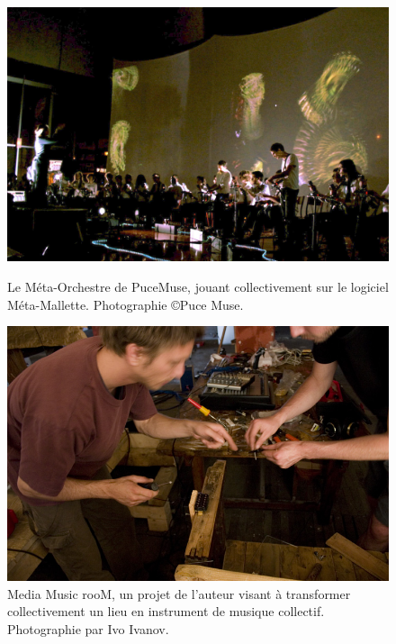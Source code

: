 \begin{figure}[!htbp]
	\captionsetup{format=plain}%
	\centering
	\begin{minipage}[t]{0.48\textwidth}
		\includegraphics[width=\linewidth]{gfx/02_ephemeral/MetaOrchestre.jpg}
		\caption[Méta-Orchestre, jouant collectivement sur le logiciel Méta-Mallette]{Le Méta-Orchestre de PuceMuse, jouant collectivement sur le logiciel Méta-Mallette. Photographie \copyright Puce Muse.}
		\label{fig:ephemeral:meta-orchestre}
	\end{minipage}
	\hspace{.02\linewidth}
	\begin{minipage}[t]{0.48\textwidth}
	  \includegraphics[width=\linewidth]{gfx/02_ephemeral/MediaMusicRoom.jpg}
		\caption[Media Music rooM, transformation collectivement d'un lieu en instrument de musique]{Media Music rooM, un projet de l'auteur visant à transformer collectivement un lieu en instrument de musique collectif. Photographie par Ivo Ivanov.}
		\label{fig:ephemeral:mediamusicroom}
	\end{minipage}
\end{figure}

